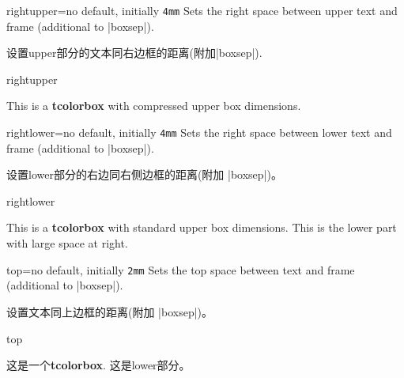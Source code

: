 \begin{docTcbKey}{rightupper}{=}{no default, initially \texttt{4mm}}
  Sets the right space between upper text and frame (additional to |boxsep|).

设置upper部分的文本同右边框的距离(附加|boxsep|).
\begin{exdispExample}{rightupper}

\begin{tcolorbox}[width=5cm,rightupper=2cm,title=My very long title text]
This is a \textbf{tcolorbox} with compressed upper box dimensions.
\end{tcolorbox}
\end{exdispExample}
\end{docTcbKey}





\begin{docTcbKey}{rightlower}{=}{no default, initially \texttt{4mm}}
  Sets the right space between lower text and frame (additional to |boxsep|).

设置lower部分的右边同右侧边框的距离(附加 |boxsep|)。
\begin{exdispExample}{rightlower}

\begin{tcolorbox}[width=5cm,rightlower=2cm]
This is a \textbf{tcolorbox} with standard upper box dimensions.
\tcblower
This is the lower part with large space at right.
\end{tcolorbox}
\end{exdispExample}
\end{docTcbKey}



\begin{docTcbKey}{top}{=}{no default, initially \texttt{2mm}}
  Sets the top space between text and frame (additional to |boxsep|).

设置文本同上边框的距离(附加 |boxsep|)。
\begin{exdispExample}{top}

\begin{tcolorbox}[top=0mm]
这是一个\textbf{tcolorbox}.
\tcblower
这是lower部分。
\end{tcolorbox}
\end{exdispExample}
\end{docTcbKey}



